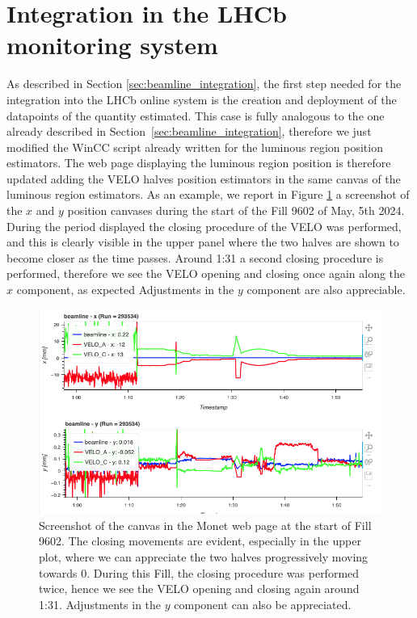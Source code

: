 
\section{Integration in the LHCb monitoring system}\label{sec:integration_detector}
As described in Section \ref{sec:beamline_integration}, the first step needed for the integration into the LHCb online system is the creation and deployment of the datapoints of the quantity estimated. This case is fully analogous to the one already described in Section~\ref{sec:beamline_integration}, therefore we just modified the WinCC script already written for the luminous region position estimators. The web page displaying the luminous region position is therefore updated adding the VELO halves position estimators in the same canvas of the luminous region estimators. As an example, we report in Figure \ref{fig:VELO_closing_xy} a screenshot of the $x$ and $y$ position canvases during the start of the Fill 9602 of May, 5th 2024. During the period displayed the closing procedure of the VELO was performed, and this is clearly visible in the upper panel where the two halves are shown to become closer as the time passes. Around 1:31 a second closing procedure is performed, therefore we see the VELO opening and closing once again along the $x$ component, as expected Adjustments in the $y$ component are also appreciable.
\begin{figure}
    \centering
    \includegraphics[width=\textwidth]{figures/VELO_closing_xy.png}
    \caption{Screenshot of the canvas in the Monet web page at the start of Fill 9602. The closing movements are evident, especially in the upper plot, where we can appreciate the two halves progressively moving towards 0. During this Fill, the closing procedure was performed twice, hence we see the VELO opening and closing again around 1:31. Adjustments in the $y$ component can also be appreciated.} 
    \label{fig:VELO_closing_xy}
\end{figure}

